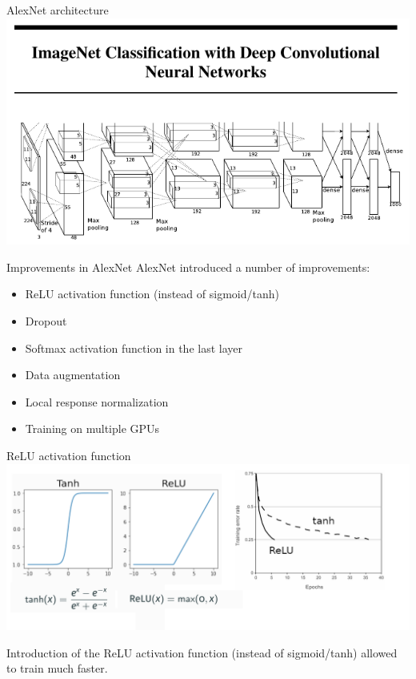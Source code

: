 \documentclass[9pt, aspectratio=169]{beamer}
\begin{document}
\begin{frame}
    {AlexNet architecture}
    \centering
    \includegraphics[width=\textwidth]{AlexNet.png}
\end{frame}

\begin{frame}
    {Improvements in AlexNet}
    AlexNet introduced a number of improvements:

    \begin {itemize}
    \item ReLU activation function (instead of sigmoid/tanh)
    \item Dropout
    \item Softmax activation function in the last layer
    \item Data augmentation
    \item \color{gray}Local response normalization
    \item Training on multiple GPUs
    \end {itemize}
\end{frame}

\begin{frame}
    {ReLU activation function}
    \centering
    \includegraphics[width=\textwidth]{alexnet_relu.png}

    Introduction of the ReLU activation function (instead of sigmoid/tanh) allowed to train much faster.
\end{frame}
\end{document}
